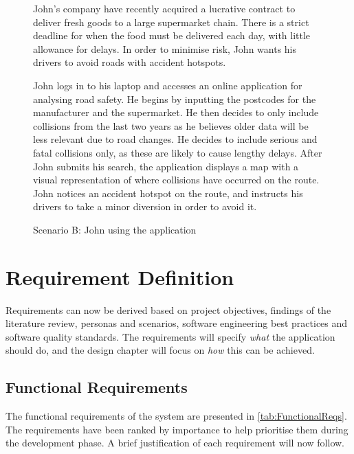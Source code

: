 \documentclass[authoryearcitations]{UoYCSproject}
\begin{document}
\begin{figure}
	\begin{framed}
 		John's company have recently acquired a lucrative contract to deliver fresh goods to a large supermarket chain. There is a strict deadline for when the food must be delivered each day, with little allowance for delays. In order to minimise risk, John wants his drivers to avoid roads with accident hotspots.
 		
 		John logs in to his laptop and accesses an online application for analysing road safety. He begins by inputting the postcodes for the manufacturer and the supermarket. He then decides to only include collisions from the last two years as he believes older data will be less relevant due to road changes. He decides to include serious and fatal collisions only, as these are likely to cause lengthy delays. After John submits his search, the application displays a map with a visual representation of where collisions have occurred on the route. John notices an accident hotspot on the route, and instructs his drivers to take a minor diversion in order to avoid it.
  	\end{framed}
  \caption{Scenario B: John using the application}
  \label{fig:scenarioB}
\end{figure}


\section{Requirement Definition}

Requirements can now be derived based on project objectives, findings of the literature review, personas and scenarios, software engineering best practices and software quality standards. The requirements will specify \textit{what} the application should do, and the design chapter will focus on \textit{how} this can be achieved.

\subsection{Functional Requirements}
\label{sect:functReqs}

The functional requirements of the system are presented in \autoref{tab:FunctionalReqs}. The requirements have been ranked by importance to help prioritise them during the development phase. A brief justification of each requirement will now follow. 
\end{document}
